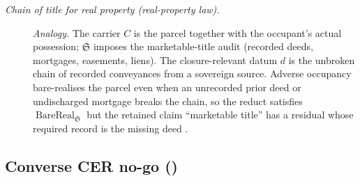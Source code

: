 \begin{description}
\item[\emph{Chain of title for real property
(real-property law).}] \textit{Analogy.}
The carrier \(C\) is the parcel together with
the occupant's actual possession; \(\mathfrak S\)
imposes the marketable-title audit (recorded
deeds, mortgages, easements, liens).  The
closure-relevant datum \(d\) is the unbroken
chain of recorded conveyances from a sovereign
source.  Adverse occupancy bare-realises the
parcel even when an unrecorded prior deed or
undischarged mortgage breaks the chain, so the
reduct satisfies \(\operatorname{BareReal}
_{\mathfrak S}\) but the retained claim
``marketable title'' has a residual whose
required record is the missing deed
\citep{Palomar2003Patton}.
\end{description}
\endgroup

\subsection*{Converse CER no-go ()}
\begingroup\small
